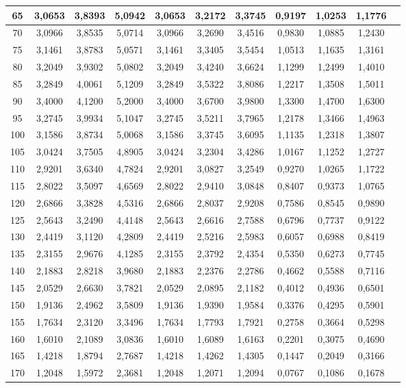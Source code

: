 \documentclass[main]{subfiles}
\begin{document}
{\begin{spacing}{1}
\begin{table}[!htbp]
\begin{tabular}{|c|c|c|c|c|c|c|c|c|c|c|}
65 & 3,0653 & 3,8393 & 5,0942 & 3,0653 & 3,2172 & 3,3745 & 0,9197 & 1,0253 & 1,1776\\ \hline
70 & 3,0966 & 3,8535 & 5,0714 & 3,0966 & 3,2690 & 3,4516 & 0,9830 & 1,0885 & 1,2430\\ \hline
75 & 3,1461 & 3,8783 & 5,0571 & 3,1461 & 3,3405 & 3,5454 & 1,0513 & 1,1635 & 1,3161\\ \hline
80 & 3,2049 & 3,9302 & 5,0802 & 3,2049 & 3,4240 & 3,6624 & 1,1299 & 1,2499 & 1,4010\\ \hline
85 & 3,2849 & 4,0061 & 5,1209 & 3,2849 & 3,5322 & 3,8086 & 1,2217 & 1,3508 & 1,5011\\ \hline
90 & 3,4000 & 4,1200 & 5,2000 & 3,4000 & 3,6700 & 3,9800 & 1,3300 & 1,4700 & 1,6300\\ \hline
95 & 3,2745 & 3,9934 & 5,1047 & 3,2745 & 3,5211 & 3,7965 & 1,2178 & 1,3466 & 1,4963\\ \hline
100 & 3,1586 & 3,8734 & 5,0068 & 3,1586 & 3,3745 & 3,6095 & 1,1135 & 1,2318 & 1,3807\\ \hline
105 & 3,0424 & 3,7505 & 4,8905 & 3,0424 & 3,2304 & 3,4286 & 1,0167 & 1,1252 & 1,2727\\ \hline
110 & 2,9201 & 3,6340 & 4,7824 & 2,9201 & 3,0827 & 3,2549 & 0,9270 & 1,0265 & 1,1722\\ \hline
115 & 2,8022 & 3,5097 & 4,6569 & 2,8022 & 2,9410 & 3,0848 & 0,8407 & 0,9373 & 1,0765\\ \hline
120 & 2,6866 & 3,3828 & 4,5316 & 2,6866 & 2,8037 & 2,9208 & 0,7586 & 0,8545 & 0,9890\\ \hline
125 & 2,5643 & 3,2490 & 4,4148 & 2,5643 & 2,6616 & 2,7588 & 0,6796 & 0,7737 & 0,9122\\ \hline
130 & 2,4419 & 3,1120 & 4,2809 & 2,4419 & 2,5216 & 2,5983 & 0,6057 & 0,6988 & 0,8419\\ \hline
135 & 2,3155 & 2,9676 & 4,1285 & 2,3155 & 2,3792 & 2,4354 & 0,5350 & 0,6273 & 0,7745\\ \hline
140 & 2,1883 & 2,8218 & 3,9680 & 2,1883 & 2,2376 & 2,2786 & 0,4662 & 0,5588 & 0,7116\\ \hline
145 & 2,0529 & 2,6630 & 3,7821 & 2,0529 & 2,0895 & 2,1182 & 0,4012 & 0,4936 & 0,6501\\ \hline
150 & 1,9136 & 2,4962 & 3,5809 & 1,9136 & 1,9390 & 1,9584 & 0,3376 & 0,4295 & 0,5901\\ \hline
155 & 1,7634 & 2,3120 & 3,3496 & 1,7634 & 1,7793 & 1,7921 & 0,2758 & 0,3664 & 0,5298\\ \hline
160 & 1,6010 & 2,1089 & 3,0836 & 1,6010 & 1,6089 & 1,6163 & 0,2201 & 0,3075 & 0,4690\\ \hline
165 & 1,4218 & 1,8794 & 2,7687 & 1,4218 & 1,4262 & 1,4305 & 0,1447 & 0,2049 & 0,3166\\ \hline
170 & 1,2048 & 1,5972 & 2,3681 & 1,2048 & 1,2071 & 1,2094 & 0,0767 & 0,1086 & 0,1678\\ \hline
\end{tabular}
\end{table}
\end{spacing}} 
\end{document}
